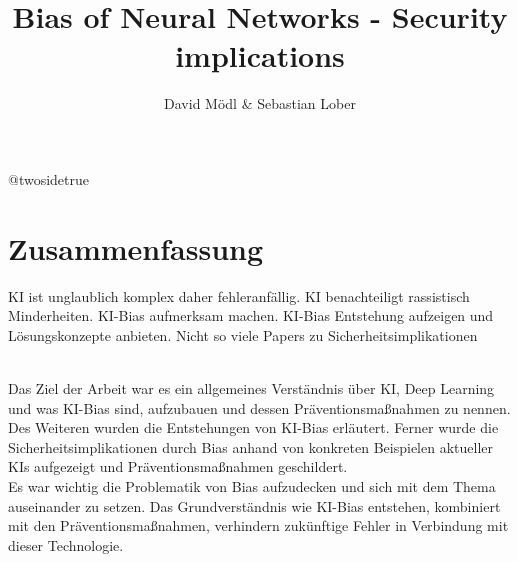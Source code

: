 \documentclass[12pt,oneside,a4paper,parskip]{scrbook}
\makeatletter
\def\BaAuthorStudyProgram{Informatik} %
\def\BaType{Seminararbeit} %
\def\BaTitle{Bias of Neural Networks - Security implications}
\def\BaSupervisorOne{Prof.\ Dr.\ A B}
\def\BaSupervisorTwo{Prof.\ Dr.\ C D}
\def\BaDeadline{\today}
\newcommand*{\forcetwosidetitle}[1][1]{%
 \begingroup
   \cleardoubleoddpage
   \KOMAoptions{titlepage=true}%
   \csname @twosidetrue\endcsname
   \maketitle[{#1}]
 \endgroup
}
\makeatother
\begin{document}


\frontmatter
\titlehead{%
  {Hochschule für angewandte Wissenschaften Würzburg-Schweinfurt\\
   Fakultät Informatik und Wirtschaftsinformatik}}
\subject{\BaType}
\title{\BaTitle\\[15mm]}
\author{David Mödl \& Sebastian Lober}
\forcetwosidetitle



\section*{Zusammenfassung}
KI ist unglaublich komplex daher fehleranfällig.
KI benachteiligt rassistisch Minderheiten.
KI-Bias aufmerksam machen.
KI-Bias Entstehung aufzeigen und Lösungskonzepte anbieten.
Nicht so viele Papers zu Sicherheitsimplikationen 



\\
Das Ziel der Arbeit war es ein allgemeines Verständnis über KI, Deep Learning und was KI-Bias sind, aufzubauen und dessen Präventionsmaßnahmen zu nennen. Des Weiteren wurden die Entstehungen von KI-Bias erläutert. Ferner wurde die Sicherheitsimplikationen durch Bias anhand von konkreten Beispielen aktueller KIs aufgezeigt und Präventionsmaßnahmen geschildert.
\\
Es war wichtig die Problematik von Bias aufzudecken und sich mit dem Thema auseinander zu setzen. Das Grundverständnis wie KI-Bias entstehen, kombiniert mit den Präventionsmaßnahmen, verhindern zukünftige Fehler in Verbindung mit dieser Technologie.
\tableofcontents



\mainmatter
\end{document}
